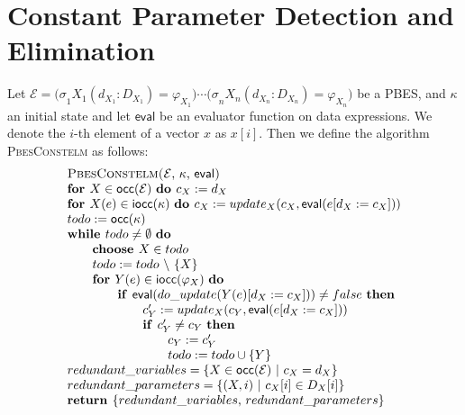 \documentclass{article}
\begin{document}
\newpage

\section{Constant Parameter Detection and Elimination}

Let $\mathcal{E=(\sigma }_{1}X_{1}(d_{X_{1}}:D_{X_{1}})=\varphi
_{X_{1}})\cdots \mathcal{(\sigma }_{n}X_{n}(d_{X_{n}}:D_{X_{n}})=\varphi
_{X_{n}})$ be a PBES, and $\kappa $ an initial state and let $\mathsf{eval}$
be an evaluator function on data expressions. We denote the $i$-th element
of a vector $x$ as $x[i]$. Then we define the algorithm \textsc{PbesConstelm}
as follows:$\qquad \qquad $%
\begin{equation*}
\begin{array}{l}
\text{\textsc{PbesConstelm(}}\mathcal{E}\text{, }\kappa \text{, }\mathsf{eval%
}\text{\textsc{)}} \\ 
\text{\textbf{for }}X\in \mathsf{occ}(\mathcal{E)}\text{ \textbf{do }}%
c_{X}:=d_{X} \\ 
\text{\textbf{for }}X(e)\in \mathsf{iocc}(\kappa \mathcal{)}\text{ \textbf{%
do }}c_{X}:=update_{X}(c_{X},\mathsf{eval}(e[d_{X}:=c_{X}])) \\ 
todo:=\mathsf{occ}(\kappa \mathcal{)} \\ 
\text{\textbf{while }}todo\neq \emptyset \text{ \textbf{do}} \\ 
\qquad \text{\textbf{choose }}X\in todo \\ 
\qquad todo:=todo\ \backslash \ \{X\} \\ 
\qquad \text{\textbf{for }}Y(e)\in \mathsf{iocc}(\varphi _{X}\mathcal{)}%
\text{ \textbf{do}} \\ 
\qquad \qquad \text{\textbf{if }}\mathsf{eval}(do%
\_update(Y(e)[d_{X}:=c_{X}]))\neq false\text{ \textbf{then}} \\ 
\qquad \qquad \qquad c_{Y}^{\prime }:=update_{X}(c_{Y},\mathsf{eval}%
(e[d_{X}:=c_{X}])) \\ 
\qquad \qquad \qquad \text{\textbf{if }}c_{Y}^{\prime }\neq c_{Y}\text{ 
\textbf{then}} \\ 
\qquad \qquad \qquad \qquad c_{Y}:=c_{Y}^{\prime } \\ 
\qquad \qquad \qquad \qquad todo:=todo\cup \{Y\} \\ 
redundant\_variables=\{X\in \mathsf{occ}(\mathcal{E)}\ |\ c_{X}=d_{X}\} \\ 
redundant\_parameters=\{(X,i)\ |\ c_{X}[i]\in D_{X}[i]\} \\ 
\text{\textbf{return }}\{redundant\_variables\text{, }redundant\_parameters\}%
\end{array}%
\end{equation*}
\end{document}
